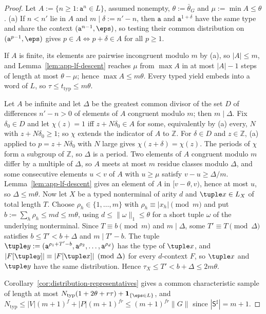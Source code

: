 \begin{proof}
Let $A:=\{n\ge1:\mathtt a^n\in L\}$, assumed nonempty, $\theta:=\bar\theta_G$ and
$\mu:=\min A\le\theta$.  (a) If $n<n'$ lie in $A$ and $m\mid\delta:=n'-n$, then
$\mathtt a$ and $\mathtt a^{1+\delta}$ have the same type and share the context
$(\mathtt a^{n-1},\eps)$, so testing their common distribution on
$(\mathtt a^{p-1},\eps)$ gives $p\in A\iff p+\delta\in A$ for all $p\ge1$.

If $A$ is finite, its elements are pairwise incongruent modulo $m$ by (a), so
$|A|\le m$, and Lemma~\ref{lem:app-lf-descent} reaches $\mu$ from $\max A$ in
at most $|A|-1$ steps of length at most $\theta-\mu$; hence $\max A\le m\theta$.
Every typed yield embeds into a word of $L$, so $\tau\le t_{\mathrm{typ}}\le m\theta$.

Let $A$ be infinite and let $\Delta$ be the greatest common divisor of the set $D$ of
differences $n'-n>0$ of elements of $A$ congruent modulo $m$; then $m\mid\Delta$.
Fix $\delta_0\in D$ and let $\chi(z)=1$ iff $z+N\delta_0\in A$ for some, equivalently
by (a) every, $N$ with $z+N\delta_0\ge1$; so $\chi$ extends the indicator of $A$ to
$\mathbb Z$.  For $\delta\in D$ and $z\in\mathbb Z$, (a) applied to $p=z+N\delta_0$ with $N$
large gives $\chi(z+\delta)=\chi(z)$.  The periods of $\chi$ form a subgroup of
$\mathbb Z$, so $\Delta$ is a period.  Two elements of $A$ congruent modulo $m$ differ by a multiple of $\Delta$, so
$A$ meets at most $m$ residue classes modulo $\Delta$, and some consecutive elements
$u<v$ of $A$ with $u\ge\mu$ satisfy $v-u\ge\Delta/m$.  Lemma~\ref{lem:app-lf-descent}
gives an element of $A$ in $[v-\theta,v)$, hence at most $u$, so $\Delta\le m\theta$.
Now let $X$ be a typed nonterminal of arity $d$ and $\tuple x\in L_X$ of total
length $T$.  Choose $\rho_h\in\{1,\ldots,m\}$ with $\rho_h\equiv|x_h|\pmod m$ and
put $b:=\sum_h\rho_h\le md\le m\theta$, using $d\le\|\omega\|_1\le\theta$ for a short
tuple $\omega$ of the underlying nonterminal.  Since $T\equiv b\pmod m$ and
$m\mid\Delta$, some $T'\equiv T\pmod\Delta$ satisfies $b\le T'<b+\Delta$ and $m\mid T'-b$.  The
tuple $\tuple y:=(\mathtt a^{\rho_1+T'-b},\mathtt a^{\rho_2},\ldots,\mathtt a^{\rho_d})$
has the type of $\tuple x$, and $|F[\tuple y]|\equiv|F[\tuple x]|\pmod\Delta$ for every
$d$-context $F$, so $\tuple x$ and $\tuple y$ have the same distribution.  Hence
$\tau_X\le T'<b+\Delta\le2m\theta$.

Corollary~\ref{cor:distribution-representatives} gives a common characteristic
sample of length at most $N_{\mathrm{typ}}(1+2\theta+r\tau)+\mathbf 1_{\{\eps\in L\}}$,
and $N_{\mathrm{typ}}\le|V|(m+1)^f+|P|(m+1)^{fr}\le(m+1)^{fr}\|G\|$ since
$|\mathsf S^\sharp|=m+1$.
\end{proof}

